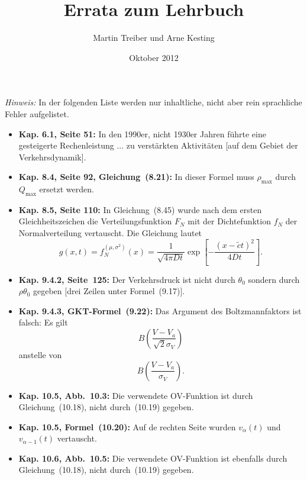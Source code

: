 \documentclass[11pt,a4paper]{scrartcl}
\title{Errata zum Lehrbuch\\\gquote{Verkehrsdynamik und \mbox{-simulation}}}
\author{Martin Treiber und Arne Kesting}
\date{Oktober 2012}
\providecommand{\3}{{\ss}}
\begin{document}
\maketitle
\emph{Hinweis:}
In der folgenden Liste  werden nur inhaltliche, nicht aber rein
sprachliche Fehler aufgelistet.

\begin{itemize}

\item
\textbf{Kap. 6.1, Seite 51:}
In den 1990er, nicht 1930er Jahren f\"uhrte eine gesteigerte
Rechenleistung ... zu verst\"arkten Aktivit\"aten [auf dem Gebiet der
  Verkehrsdynamik].

\item
\textbf{Kap. 8.4, Seite 92, Gleichung~(8.21):}
In dieser Formel muss $\rho_\text{max}$ durch $Q_\text{max}$ ersetzt
werden.

\item
\textbf{Kap. 8.5, Seite 110:}
In Gleichung~(8.45) wurde nach dem ersten Gleichheits\-zeichen die Verteilungsfunktion $F_N$  mit der Dichtefunktion $f_N$ der Normalverteilung vertauscht. Die Gleichung lautet 
\begin{equation*}
g(x,t)=f_N^{(\mu, \sigma^2)}(x)
 = \frac{1}{\sqrt{4\pi D t}} \exp\left[- \frac{(x-\tilde{c}t)^2}{4Dt} \right].
\end{equation*}

\item
\textbf{Kap. 9.4.2, Seite~125:}
Der Verkehrsdruck ist nicht durch $\theta_0$ sondern durch
$\rho\theta_0$ gegeben [drei Zeilen unter Formel~(9.17)].

\item
\textbf{Kap. 9.4.3, GKT-Formel~(9.22):}
Das Argument des Boltzmannfaktors ist falsch: Es gilt
\begin{equation*}
B\left(\frac{V-V_a}{\sqrt{2} \sigma_V}\right)
\end{equation*}
anstelle von
\begin{equation*}
B\left(\frac{V-V_a}{\sigma_V}\right).
\end{equation*}

\item
\textbf{Kap. 10.5, Abb.~10.3:}
Die verwendete OV-Funktion ist durch Gleichung~(10.18), nicht durch~(10.19)
gegeben.
 
\item
\textbf{Kap. 10.5, Formel~(10.20):}
Auf de rechten Seite wurden $v_{\alpha}(t)$ und $v_{\alpha-1}(t)$ vertauscht.
 
\item
\textbf{Kap. 10.6, Abb.~10.5:}
Die verwendete OV-Funktion ist ebenfalls durch Gleichung~(10.18), nicht durch~(10.19)
gegeben.


\end{itemize}
\end{document}
